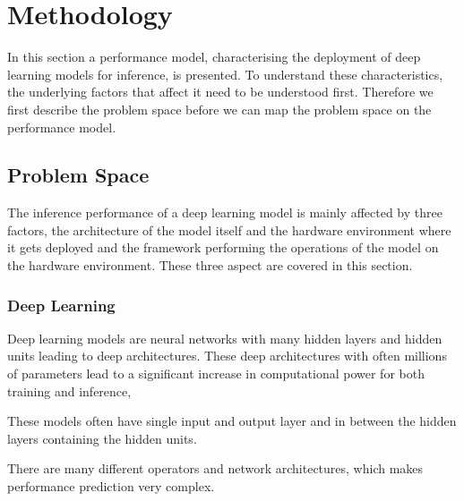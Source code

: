 \chapter{Methodology}
\label{chap:methodology}
In this section a performance model, characterising the deployment of deep learning models for inference, is presented. To understand these characteristics, the underlying factors that affect it need to be understood first. Therefore we first describe the problem space before we can map the problem space on the performance model.


\section{Problem Space}
The inference performance of a deep learning model is mainly affected by three factors, the architecture of the model itself and the hardware environment where it gets deployed and the framework performing the operations of the model on the hardware environment.
These three aspect are covered in this section.


\subsection{Deep Learning}

Deep learning models are neural networks with many hidden layers and hidden units leading to deep architectures.
These deep architectures with often millions of parameters lead to a significant increase in computational power for both training and inference,

These models often have single input and output layer and in between the hidden layers containing the hidden units.

There are many different operators and network architectures, which makes performance prediction very complex.

